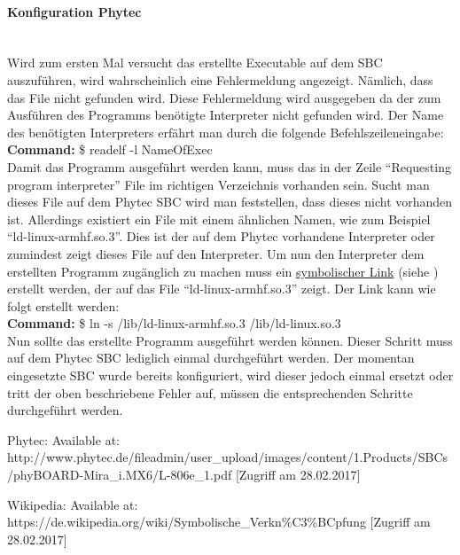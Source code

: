 \documentclass[12pt]{article} %
\begin{document}
	\paragraph{Konfiguration Phytec}\ \\
	Wird zum ersten Mal versucht das erstellte Executable auf dem SBC auszuführen, wird wahrscheinlich eine Fehlermeldung angezeigt. Nämlich, dass das File nicht gefunden wird. Diese Fehlermeldung wird ausgegeben da der zum Ausführen des Programms benötigte Interpreter nicht gefunden wird. Der Name des benötigten Interpreters erfährt man durch die folgende Befehlszeileneingabe:
	\\[0.2cm]
	\noindent\hspace*{30mm} \textbf{Command:} \$ readelf -l NameOfExec
	\\[0.2cm]
	Damit das Programm ausgeführt werden kann, muss das in der Zeile "`Requesting program interpreter"' File im richtigen Verzeichnis vorhanden sein. Sucht man dieses File auf dem Phytec SBC wird man feststellen, dass dieses nicht vorhanden ist. Allerdings existiert ein File mit einem ähnlichen Namen, wie zum Beispiel "`ld-linux-armhf.so.3"'. Dies ist der auf dem Phytec vorhandene Interpreter oder zumindest zeigt dieses File auf den Interpreter. Um nun den Interpreter dem erstellten Programm zugänglich zu machen muss ein \href{https://de.wikipedia.org/wiki/Symbolische\_Verkn\%C3\%BCpfung}{symbolischer Link} (siehe \cite{wiki}) erstellt werden, der auf das File "`ld-linux-armhf.so.3"' zeigt. Der Link kann wie folgt erstellt werden:
	\\ [0.2cm]
	\noindent\hspace*{30mm} \textbf{Command:} \$ ln -s /lib/ld-linux-armhf.so.3 /lib/ld-linux.so.3
	\\[0.2cm]
	Nun sollte das erstellte Programm ausgeführt werden können. Dieser Schritt muss auf dem Phytec SBC lediglich einmal durchgeführt werden. Der momentan eingesetzte SBC wurde bereits konfiguriert, wird dieser jedoch einmal ersetzt oder tritt der oben beschriebene Fehler auf, müssen die entsprechenden Schritte durchgeführt werden.
	\newpage
	\renewcommand\refname{Literaturverzeichnis}
	\begin{thebibliography}{99} %
		\raggedright
		
		Phytec:
		\newblock [online] Available at: http://www.phytec.de/fileadmin/user\_upload/images/content/1.Products/SBCs/phyBOARD-Mira\_i.MX6/L-806e\_1.pdf [Zugriff am 28.02.2017]
		
		Wikipedia:
		\newblock [online] Available at: https://de.wikipedia.org/wiki/Symbolische\_Verkn\%C3\%BCpfung [Zugriff am 28.02.2017]
		
		
		
	\end{thebibliography}

	
\end{document}
